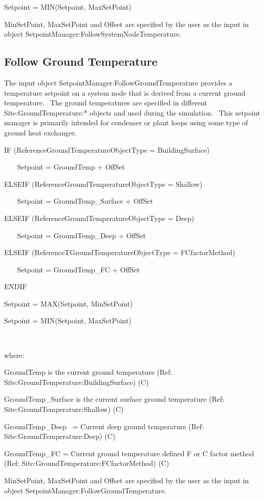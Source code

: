 Setpoint = MIN(Setpoint, MaxSetPoint)

MinSetPoint, MaxSetPoint and Offset are specified by the user as the input in object SetpointManager:FollowSystemNodeTemperature.

\subsection{Follow Ground Temperature}\label{follow-ground-temperature}

The input object SetpointManager:FollowGroundTemperature provides a temperature setpoint on a system node that is derived from a current ground temperature.~ The ground temperatures are specified in different Site:GroundTemperature:* objects and used during the simulation.~ This setpoint manager is primarily intended for condenser or plant loops using some type of ground heat exchanger.

IF (ReferenceGroundTemperatureObjectType = BuildingSurface)

~~~ Setpoint = GroundTemp + OffSet

ELSEIF (ReferenceGroundTemperatureObjectType = Shallow)

~~~ Setpoint = GroundTemp\_Surface + OffSet

ELSEIF (ReferenceGroundTemperatureObjectType = Deep)

~~~ Setpoint = GroundTemp\_Deep + OffSet

ELSEIF (ReferenceTGroundTemperatureObjectType = FCfactorMethod)

~~~ Setpoint = GroundTemp\_FC + OffSet

ENDIF

Setpoint = MAX(Setpoint, MinSetPoint)

Setpoint = MIN(Setpoint, MaxSetPoint)

\emph{~}

where:

GroundTemp is the current ground temperature (Ref: Site:GroundTemperature:BuildingSurface) (C)

GroundTemp\_Surface is the current surface ground temperature (Ref: Site:GroundTemperature:Shallow) (C)

GroundTemp\_Deep~ = Current deep ground temperature (Ref: Site:GroundTemperature:Deep) (C)

GroundTemp\_FC = Current ground temperature defined F or C factor method (Ref: Site:GroundTemperature:FCfactorMethod) (C)

MinSetPoint, MaxSetPoint and Offset are specified by the user as the input in object SetpointManager:FollowGroundTemperature.

